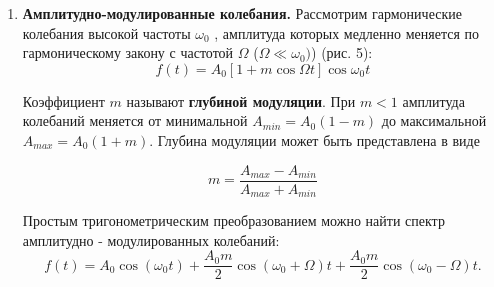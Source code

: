 \documentclass[a4paper,12pt]{article} %
\begin{document}
\begin{enumerate}
	\item \textbf{Амплитудно-модулированные колебания.} Рассмотрим гармонические колебания высокой частоты $\omega_{0}$ , амплитуда которых медленно меняется по гармоническому закону с частотой $\Omega$ ($\Omega \ll \omega_{0})$) (рис. 5):
\begin{equation}
    f(t)=A_{0}[1+m\cos\Omega t]\cos \omega_{0}t
\label{eq7}
\end{equation}	

	Коэффициент $m$ называют \textbf{глубиной модуляции}. При $m<1$ амплитуда колебаний меняется от минимальной $A_{min}=A_{0}(1-m)$ до максимальной $A_{max}=A_{0}(1+m).$ Глубина модуляции может быть представлена в виде
	
\begin{equation}\label{m}
	 m=\dfrac{A_{max}-A_{min}}{A_{max}+A_{min}}
\label{eq8}
\end{equation}
	
	Простым тригонометрическим преобразованием можно найти спектр амплитудно - модулированных колебаний:
	\\
\begin{equation}\label{a}
	f(t)=A_{0}\cos(\omega_{0} t)+\dfrac{A_{0}m}{2}\cos(\omega_{0}+\Omega)t+\dfrac{A_{0}m}{2}\cos(\omega_{0}-\Omega)t.
\end{equation}
		

\end{enumerate}
\end{document}
